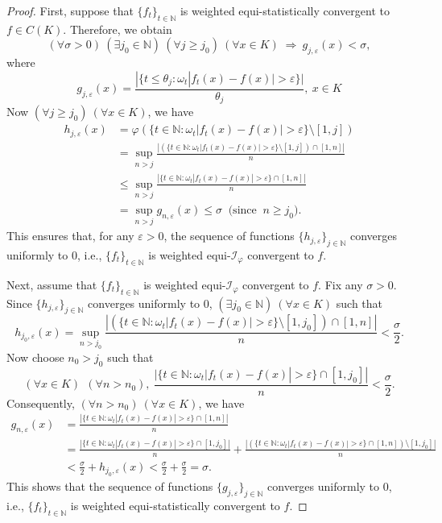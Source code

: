 \documentclass[reqno]{amsart}
\begin{document}
{\begin{proof}
 First, suppose that  $\{f_t\}_{t \in \mathbb{N}}$ is  weighted equi-statistically convergent to $f \in C(K)$. Therefore, we obtain 
$$
(\forall \sigma>0)~(\exists j_0\in\mathbb{N})~(\forall j\geq j_0)~(\forall x\in K)\;\Rightarrow ~g_{j,\varepsilon}(x)<\sigma,
$$
where 
\begin{equation*}
	g_{j,\varepsilon}(x)=\frac{|\{t\leq \theta_j:\omega_t|f_t(x)-f(x)|> \varepsilon\}|}{\theta_j},~x\in K
\end{equation*}
Now $(\forall j\geq j_0)~(\forall x\in K)$, we have 
\begin{align*}
h_{j,\varepsilon}(x)&=\varphi(\{t\in\mathbb{N}:\omega_t|f_t(x)-f(x)|> \varepsilon\}\setminus[1,j])\\
&=\sup_{n>j}\frac{|(\{t\in\mathbb{N}:\omega_t|f_t(x)-f(x)|> \varepsilon\}\setminus[1,j])\cap [1,n]|}{n}\\
&\leq \sup_{n>j}\frac{|\{t\in\mathbb{N}:\omega_t|f_t(x)-f(x)|> \varepsilon\}\cap [1,n]|}{n}\\
&=\sup_{n>j}g_{n,\varepsilon}(x)\leq\sigma~\mbox{ (since }~n\geq j_0).
\end{align*}
This ensures that, for any $\varepsilon>0$, the sequence of functions $\{h_{j,\varepsilon}\}_{j\in\mathbb{N}}$ converges uniformly to $0$, i.e., $\{f_t\}_{t \in \mathbb{N}}$ is  weighted equi-$\mathcal{I}_\varphi$ convergent to $f$.

Next, assume that $\{f_t\}_{t \in \mathbb{N}}$ is  weighted equi-$\mathcal{I}_\varphi$ convergent to $f$. Fix any $\sigma>0$. Since  $\{h_{j,\varepsilon}\}_{j\in\mathbb{N}}$ converges uniformly to $0$, $(\exists j_0\in\mathbb{N})~(\forall x\in K)$ such that 
$$
h_{j_0,\varepsilon}(x)=\sup_{n>j_0}\frac{|(\{t\in\mathbb{N}:\omega_t|f_t(x)-f(x)|> \varepsilon\}\setminus[1,j_0])\cap [1,n]|}{n}<\frac{\sigma}{2}.
$$
Now choose $n_0> j_0$ such that 
$$
(\forall x\in K)~ ~(\forall n> n_0),~\frac{|\{t\in\mathbb{N}:\omega_t|f_t(x)-f(x)|> \varepsilon\}\cap[1,j_0]|}{n}<\frac{\sigma}{2}.
$$
Consequently, $(\forall n>n_0)~(\forall x\in K)$, we have 
\begin{align*}
g_{n,\varepsilon}(x)&=\frac{|\{t \in \mathbb{N} : \omega_t|f_t(x) - f(x)| > \varepsilon\} \cap [1,n]|}{n}\\
&=\frac{|\{t \in \mathbb{N} : \omega_t|f_t(x) - f(x)| >\varepsilon\} \cap [1,j_0]|}{n}+\frac{|(\{t \in \mathbb{N} : \omega_t|f_t(x) - f(x)| > \varepsilon\} \cap [1,n])\setminus [1,j_0]|}{n}\\
&<\frac{\sigma}{2}+h_{j_0,\varepsilon}(x)<\frac{\sigma}{2}+\frac{\sigma}{2}=\sigma.
\end{align*}
This shows that the sequence of functions $\{g_{j,\varepsilon}\}_{j\in\mathbb{N}}$ converges uniformly to $0$, i.e., $\{f_t\}_{t \in \mathbb{N}}$ is  weighted equi-statistically convergent to $f$. 
\end{proof}


}
\end{document}
